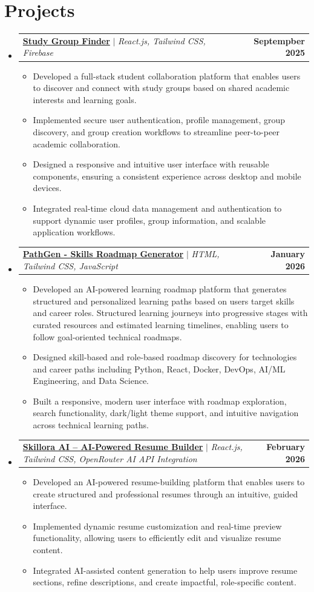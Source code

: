 \documentclass[letterpaper,11pt]{article}
\makeatletter
\newcommand{\resumeItem}[1]{
  \item\small{
    {#1 \vspace{-2pt}}
  }
}
\newcommand{\resumeProjectHeading}[2]{
    \item
    \begin{tabular*}{1.001\textwidth}{l@{\extracolsep{\fill}}r}
      \small#1 & \textbf{\small #2}\\
    \end{tabular*}\vspace{-7pt}
}
\newcommand{\resumeSubHeadingListStart}{\begin{itemize}[leftmargin=0.0in, label={}]}
\newcommand{\resumeSubHeadingListEnd}{\end{itemize}}
\newcommand{\resumeItemListStart}{\begin{itemize}}
\newcommand{\resumeItemListEnd}{\end{itemize}\vspace{-5pt}}
\makeatother
\begin{document}
\section{Projects}
    \vspace{-5pt}
    \resumeSubHeadingListStart
      \resumeProjectHeading
          {\textbf{\href{https://sgfphoneix.vercel.app/}{Study Group Finder}} $|$ \emph{React.js, Tailwind CSS, Firebase}}{Septempber 2025}
          \resumeItemListStart
            \resumeItem{Developed a full-stack student collaboration platform that enables users to discover and connect with study groups based on shared academic interests and learning goals.}
            \resumeItem{Implemented secure user authentication, profile management, group discovery, and group creation workflows to streamline peer-to-peer academic collaboration.}
            \resumeItem{Designed a responsive and intuitive user interface with reusable components, ensuring a consistent experience across desktop and mobile devices.}
            \resumeItem{Integrated real-time cloud data management and authentication to support dynamic user profiles, group information, and scalable application workflows.}
          \resumeItemListEnd
          \vspace{-13pt}
      \resumeProjectHeading
          {\textbf{\href{https://ashritanshuman.github.io/skill-roadmap-generator/}{PathGen - Skills Roadmap Generator}} $|$ \emph{HTML, Tailwind CSS, JavaScript}}{January 2026}
          \resumeItemListStart
            \resumeItem{Developed an AI-powered learning roadmap platform that generates structured and personalized learning paths based on users target skills and career roles. Structured learning journeys into progressive stages with curated resources and estimated learning timelines, enabling users to follow goal-oriented technical roadmaps.}
            \resumeItem{Designed skill-based and role-based roadmap discovery for technologies and career paths including Python, React, Docker, DevOps, AI/ML Engineering, and Data Science.}
            \resumeItem{Built a responsive, modern user interface with roadmap exploration, search functionality, dark/light theme support, and intuitive navigation across technical learning paths.}
          \resumeItemListEnd 
          \vspace{-13pt}
          \resumeProjectHeading
          {\textbf{\href{https://skilloraai.vercel.app/}{Skillora AI – AI-Powered Resume Builder}} $|$ \emph{React.js, Tailwind CSS, OpenRouter AI API Integration}}{February 2026}
          \resumeItemListStart
            \resumeItem{Developed an AI-powered resume-building platform that enables users to create structured and professional resumes through an intuitive, guided interface.}
            \resumeItem{Implemented dynamic resume customization and real-time preview functionality, allowing users to efficiently edit and visualize resume content.}
            \resumeItem{Integrated AI-assisted content generation to help users improve resume sections, refine descriptions, and create impactful, role-specific content.}
          \resumeItemListEnd 
    \resumeSubHeadingListEnd
\vspace{-15pt}
\end{document}
